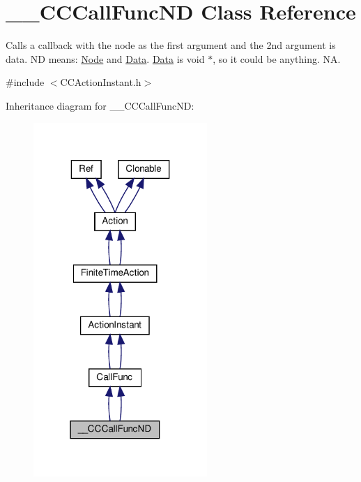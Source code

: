 \hypertarget{class____CCCallFuncND}{}\section{\+\_\+\+\_\+\+C\+C\+Call\+Func\+ND Class Reference}
\label{class____CCCallFuncND}


Calls a \textquotesingle{}callback\textquotesingle{} with the node as the first argument and the 2nd argument is data. ND means\+: \hyperlink{classNode}{Node} and \hyperlink{classData}{Data}. \hyperlink{classData}{Data} is void $\ast$, so it could be anything.  NA.  




{\ttfamily \#include $<$C\+C\+Action\+Instant.\+h$>$}



Inheritance diagram for \+\_\+\+\_\+\+C\+C\+Call\+Func\+ND\+:
\nopagebreak
\begin{figure}[H]
\begin{center}
\leavevmode
\includegraphics[width=187pt]{class____CCCallFuncND__inherit__graph}
\end{center}
\end{figure}



